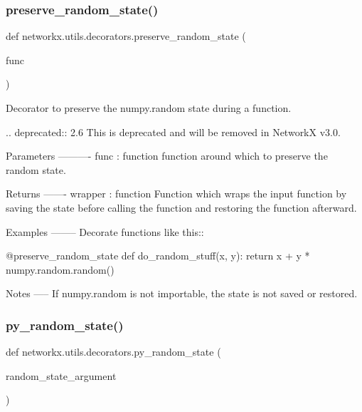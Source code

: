 \subsubsection{\texorpdfstring{preserve\+\_\+random\+\_\+state()}{preserve\_random\_state()}}
{\footnotesize\ttfamily def networkx.\+utils.\+decorators.\+preserve\+\_\+random\+\_\+state (\begin{DoxyParamCaption}\item[{}]{func }\end{DoxyParamCaption})}

\begin{DoxyVerb}Decorator to preserve the numpy.random state during a function.

.. deprecated:: 2.6
    This is deprecated and will be removed in NetworkX v3.0.

Parameters
----------
func : function
    function around which to preserve the random state.

Returns
-------
wrapper : function
    Function which wraps the input function by saving the state before
    calling the function and restoring the function afterward.

Examples
--------
Decorate functions like this::

    @preserve_random_state
    def do_random_stuff(x, y):
        return x + y * numpy.random.random()

Notes
-----
If numpy.random is not importable, the state is not saved or restored.
\end{DoxyVerb}
 \mbox{\label{namespacenetworkx_1_1utils_1_1decorators_a5168d850b80d4a80eb9423720bf3be7d}} 
\subsubsection{\texorpdfstring{py\+\_\+random\+\_\+state()}{py\_random\_state()}}
{\footnotesize\ttfamily def networkx.\+utils.\+decorators.\+py\+\_\+random\+\_\+state (\begin{DoxyParamCaption}\item[{}]{random\+\_\+state\+\_\+argument }\end{DoxyParamCaption})}

